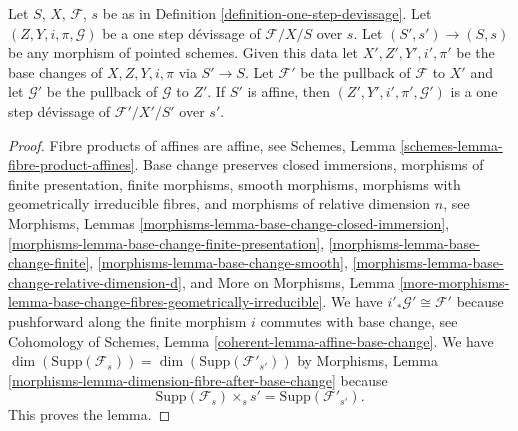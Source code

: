 \begin{lemma}
\label{lemma-base-change-one-step}
Let $S$, $X$, $\mathcal{F}$, $s$ be as in
Definition \ref{definition-one-step-devissage}.
Let $(Z, Y, i, \pi, \mathcal{G})$ be a one step d\'evissage
of $\mathcal{F}/X/S$ over $s$.
Let $(S', s') \to (S, s)$ be any morphism of pointed schemes.
Given this data let $X', Z', Y', i', \pi'$ be the base
changes of $X, Z, Y, i, \pi$ via $S' \to S$.
Let $\mathcal{F}'$ be the pullback of $\mathcal{F}$ to $X'$
and let $\mathcal{G}'$ be the pullback of $\mathcal{G}$ to $Z'$.
If $S'$ is affine, then $(Z', Y', i', \pi', \mathcal{G}')$
is a one step d\'evissage of $\mathcal{F}'/X'/S'$ over $s'$.
\end{lemma}

\begin{proof}
Fibre products of affines are affine, see
Schemes, Lemma \ref{schemes-lemma-fibre-product-affines}.
Base change preserves
closed immersions,
morphisms of finite presentation,
finite morphisms,
smooth morphisms,
morphisms with geometrically irreducible fibres, and
morphisms of relative dimension $n$, see
Morphisms, Lemmas \ref{morphisms-lemma-base-change-closed-immersion},
\ref{morphisms-lemma-base-change-finite-presentation},
\ref{morphisms-lemma-base-change-finite},
\ref{morphisms-lemma-base-change-smooth},
\ref{morphisms-lemma-base-change-relative-dimension-d}, and
More on Morphisms, Lemma
\ref{more-morphisms-lemma-base-change-fibres-geometrically-irreducible}.
We have $i'_*\mathcal{G}' \cong \mathcal{F}'$ because pushforward
along the finite morphism $i$ commutes with base change, see
Cohomology of Schemes, Lemma \ref{coherent-lemma-affine-base-change}.
We have
$\dim(\text{Supp}(\mathcal{F}_s)) = \dim(\text{Supp}(\mathcal{F}'_{s'}))$
by
Morphisms, Lemma \ref{morphisms-lemma-dimension-fibre-after-base-change}
because
$$
\text{Supp}(\mathcal{F}_s) \times_s s' = \text{Supp}(\mathcal{F}'_{s'}).
$$
This proves the lemma.
\end{proof}
